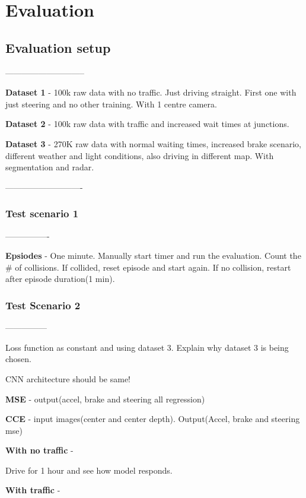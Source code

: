 \chapter{Evaluation}


\section{Evaluation setup}

-----------------------------

\textbf{Dataset 1} - 100k raw data with no traffic. Just driving straight. First one with just steering and no other training.  With 1 centre camera.

\textbf{Dataset 2} - 100k raw data with traffic and increased wait times at junctions.

\textbf{Dataset 3} - 270K raw data with normal waiting times, increased brake scenario, different weather and light conditions, also driving in different map. With segmentation and radar.

----------------------------

\subsection{Test scenario 1}

----------------

\textbf{Epsiodes} - One minute. Manually start timer and run the evaluation. Count the \# of collisions. If collided, reset episode and start again. If no collision, restart after episode duration(1 min).


\subsection{Test Scenario 2}

---------------

Loss function as constant and using dataset 3. Explain why dataset 3 is being chosen.

CNN architecture should be same!

\textbf{MSE} - output(accel, brake and steering all regression)

\textbf{CCE} - input images(center and center depth). Output(Accel, brake and steering mse)

\textbf{With no traffic} -

Drive for 1 hour and see how model responds.

\textbf{With traffic} -

